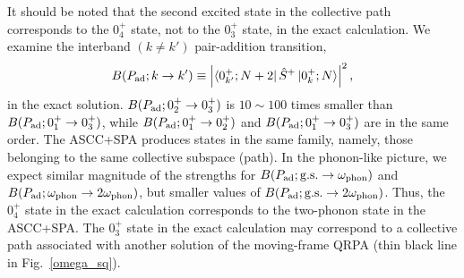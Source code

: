 \documentclass[%
superscriptaddress,
showpacs,
nofootinbib,
amsmath,amssymb,
aps,
prc,
twocolumn,
floatfix ]%
{revtex4-1}
\begin{document}
It should be noted that the second excited state in the collective path
corresponds to the $0_4^+$ state,
not to the $0_3^+$ state, in the exact calculation. 
We examine the interband $(k\neq k')$ pair-addition transition,
\begin{equation}
B(P_{\rm ad};k\rightarrow k') \equiv 
	\left|\bra{0_{k'}^+;N+2} \hat{S}^+ \ket{0_k^+;N}\right|^2 ,
\label{BPad}
\end{equation}
in the exact solution.
$B(P_{\rm ad};0_2^+\rightarrow 0_3^+)$ 
is $10\sim100$ times smaller than $B(P_{\rm ad};0_1^+\rightarrow 0_3^+)$,
while $B(P_{\rm ad};0_1^+\rightarrow 0_2^+)$ and
$B(P_{\rm ad};0_1^+\rightarrow 0_3^+)$ are in the same order.
The ASCC+SPA produces states in the same family,
namely, those belonging to the same collective subspace (path).
In the phonon-like picture,
we expect similar magnitude of the strengths for
$B(P_{\rm ad};{\rm g.s.}\rightarrow \omega_{\rm phon})$
and
$B(P_{\rm ad};\omega_{\rm phon}\rightarrow 2\omega_{\rm phon})$,
but smaller values of
$B(P_{\rm ad};{\rm g.s.}\rightarrow 2\omega_{\rm phon})$.
Thus, the $0_4^+$ state in the exact calculation
corresponds to the two-phonon state in the ASCC+SPA.
The $0_3^+$ state in the exact calculation may correspond to
a collective path associated with another solution of the moving-frame QRPA
(thin black line in Fig.~\ref{omega_sq}).

\end{document}
